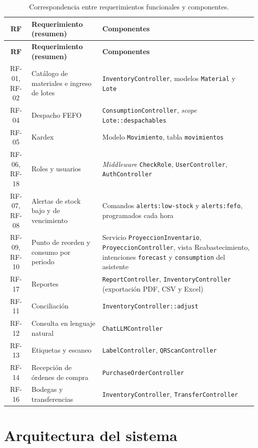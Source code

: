 {\small
\begin{longtable}{|c|p{5.2cm}|p{7cm}|}
\caption{Correspondencia entre requerimientos funcionales y componentes.}
\label{tab:dis_trazabilidad}\\
\hline
\textbf{RF} & \textbf{Requerimiento (resumen)} & \textbf{Componentes} \\
\hline
\endfirsthead
\hline
\textbf{RF} & \textbf{Requerimiento (resumen)} & \textbf{Componentes} \\
\hline
\endhead
RF-01, RF-02 & Catálogo de materiales e ingreso de lotes & \texttt{InventoryController}, modelos \texttt{Material} y \texttt{Lote} \\ \hline
RF-04 & Despacho FEFO & \texttt{ConsumptionController}, \textit{scope} \texttt{Lote::despachables} \\ \hline
RF-05 & Kardex & Modelo \texttt{Movimiento}, tabla \texttt{movimientos} \\ \hline
RF-06, RF-18 & Roles y usuarios & \textit{Middleware} \texttt{CheckRole}, \texttt{UserController}, \texttt{AuthController} \\ \hline
RF-07, RF-08 & Alertas de stock bajo y de vencimiento & Comandos \texttt{alerts:low-stock} y \texttt{alerts:fefo}, programados cada hora \\ \hline
RF-09, RF-10 & Punto de reorden y consumo por periodo & Servicio \texttt{ProyeccionInventario}, \texttt{ProyeccionController}, vista Reabastecimiento, intenciones \texttt{forecast} y \texttt{consumption} del asistente \\ \hline
RF-17 & Reportes & \texttt{ReportController}, \texttt{InventoryController} (exportación PDF, CSV y Excel) \\ \hline
RF-11 & Conciliación & \texttt{InventoryController::adjust} \\ \hline
RF-12 & Consulta en lenguaje natural & \texttt{ChatLLMController} \\ \hline
RF-13 & Etiquetas y escaneo & \texttt{LabelController}, \texttt{QRScanController} \\ \hline
RF-14 & Recepción de órdenes de compra & \texttt{PurchaseOrderController} \\ \hline
RF-16 & Bodegas y transferencias & \texttt{InventoryController}, \texttt{TransferController} \\ \hline
\end{longtable}
}

\section{Arquitectura del sistema}
\label{sec:dis_arquitectura}

